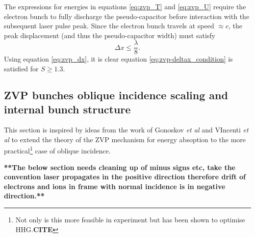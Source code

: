 The expressions for energies in equations \ref{eq:zvp_T} and \ref{eq:zvp_U} require the electron bunch to fully discharge the pseudo-capacitor before interaction with the subsequent laser pulse peak. Since the electron bunch travels at speed $\approx c$, the peak displacement (and thus the pseudo-capacitor width) must satisfy
\begin{equation}\label{eq:zvp-deltax_condition}
	\Delta x \le \frac{\lambda}{8}.
\end{equation}
Using equation \ref{eq:zvp_dx}, it is clear equation \ref{eq:zvp-deltax_condition} is satisfied for $ S\ge 1.3$.

\subsection{ZVP bunches oblique incidence scaling and internal bunch structure}
This section is inspired by ideas from the work of Gonoskov \textit{et al} \cite{gonoskovUltrarelativisticNanoplasmonicsRoute2011} and VIncenti \textit{et al} \cite{vincentiOpticalPropertiesRelativistic2014} to extend the theory of the ZVP mechanism for energy absoption to the more practical\footnote{Not only is this more feasible in experiment but has been shown to optimise HHG.\textbf{CITE}} case of oblique incidence. 


\textbf{**The below section needs cleaning up of minus signs etc, take the convention laser propagates in the positive direction therefore drift of electrons and ions in frame with normal incidence is in negative direction.**}

